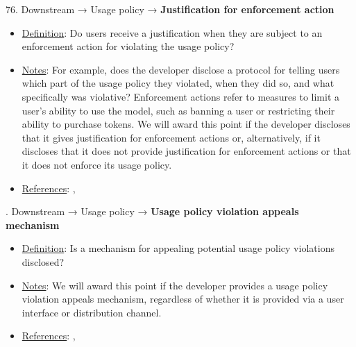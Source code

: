 76. Downstream → Usage policy → \textbf{Justification for enforcement action}
\vspace{-\parskip}
\begin{itemize}
	\item
	\underline{Definition}: Do users receive a justification when they are subject to an enforcement action for violating the usage policy?
	\item
	\underline{Notes}: For example, does the developer disclose a protocol for telling users which part of the usage policy they violated, when they did so, and what specifically was violative? Enforcement actions refer to measures to limit a user’s ability to use the model, such as banning a user or restricting their ability to purchase tokens. We will award this point if the developer discloses that it gives justification for enforcement actions or, alternatively, if it discloses that it does not provide justification for enforcement actions or that it does not enforce its usage policy.
	\item
	\underline{References}: \citet{cohere2022}, \citet{meta2023}
\end{itemize} \vspace{\baselineskip}


. Downstream → Usage policy → \textbf{Usage policy violation appeals mechanism}
\vspace{-\parskip}
\begin{itemize}
	\item
	\underline{Definition}: Is a mechanism for appealing potential usage policy violations disclosed?
	\item
	\underline{Notes}: We will award this point if the developer provides a usage policy violation appeals mechanism, regardless of whether it is provided via a user interface or distribution channel.
	\item
	\underline{References}: \citet{cohere2022}, \citet{meta2023}
\end{itemize} \vspace{\baselineskip}


